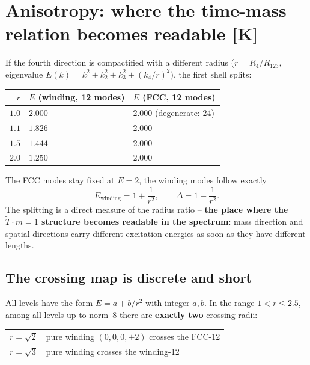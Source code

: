 \chapter{Anisotropy: where the time-mass relation becomes readable [K]}

If the fourth direction is compactified with a different radius
($r = R_4/R_{123}$, eigenvalue
$E(k) = k_1^2+k_2^2+k_3^2+(k_4/r)^2$), the first shell splits:

\begin{center}
\begin{tabular}{rll}
\toprule
$r$ & $E$ (winding, 12 modes) & $E$ (FCC, 12 modes) \\
\midrule
$1.0$ & $2.000$ & $2.000$ (degenerate: 24) \\
$1.1$ & $1.826$ & $2.000$ \\
$1.5$ & $1.444$ & $2.000$ \\
$2.0$ & $1.250$ & $2.000$ \\
\bottomrule
\end{tabular}
\end{center}

The FCC modes stay fixed at $E = 2$, the winding modes follow
exactly
\begin{equation}
  E_\text{winding} = 1 + \frac{1}{r^2},
  \qquad
  \Delta = 1 - \frac{1}{r^2}.
\end{equation}
The splitting is a direct measure of the radius ratio -- \textbf{the
place where the $\tilde T\cdot m = 1$ structure becomes readable in
the spectrum}: mass direction and spatial directions carry different
excitation energies as soon as they have different lengths.

\section{The crossing map is discrete and short}

All levels have the form $E = a + b/r^2$ with integer $a, b$. In the
range $1 < r \le 2.5$, among all levels up to norm~8 there are
\textbf{exactly two} crossing radii:

\begin{center}
\begin{tabular}{ll}
\toprule
$r = \sqrt{2}$ & pure winding $(0,0,0,\pm2)$ crosses the FCC-12 \\
$r = \sqrt{3}$ & pure winding crosses the winding-12 \\
\bottomrule
\end{tabular}
\end{center}

